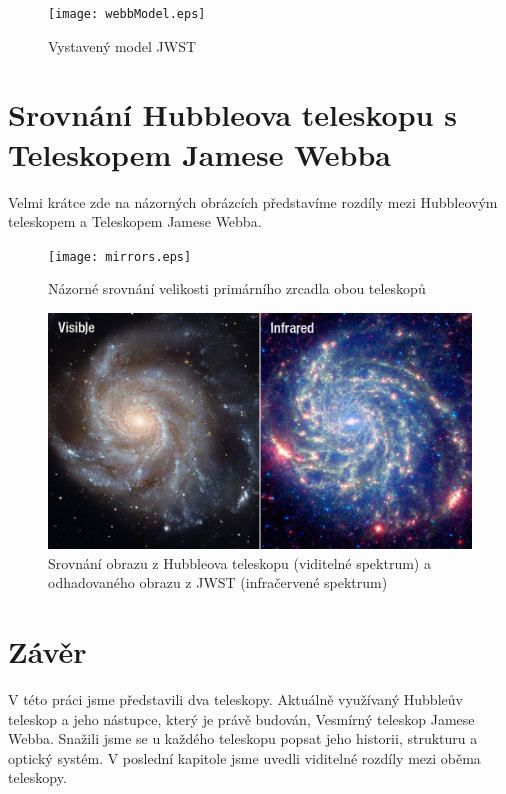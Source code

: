 \documentclass[a4paper,11pt]{article}
\begin{document}
\begin{figure}[h]
\begin{center}
\texttt{[image: webbModel.eps]}
\caption{Vystavený model JWST}
\end{center}
\end{figure}
\newpage
\section{Srovnání Hubbleova teleskopu s Teleskopem Jamese Webba}
Velmi krátce zde na názorných obrázcích představíme rozdíly mezi Hubbleovým teleskopem a Teleskopem Jamese Webba.

\begin{figure}[h]
\begin{center}
\texttt{[image: mirrors.eps]}
\caption{Názorné srovnání velikosti primárního zrcadla obou teleskopů}
\end{center}
\end{figure}

\begin{figure}[h]
\begin{center}
\includegraphics[width=16cm]{compare.jpg}
\caption{Srovnání obrazu z Hubbleova teleskopu (viditelné spektrum) a odhadovaného obrazu z JWST (infračervené spektrum)}
\end{center}
\end{figure}

\section{Závěr}
V této práci jsme představili dva teleskopy. Aktuálně využívaný Hubbleův teleskop a jeho nástupce, který je právě budován, Vesmírný teleskop Jamese Webba. Snažili jsme se u každého teleskopu popsat jeho historii, strukturu a optický systém. V poslední kapitole jsme uvedli viditelné rozdíly mezi oběma teleskopy.
\newpage


\def\refname{Použitá literatura}

\end{document}
